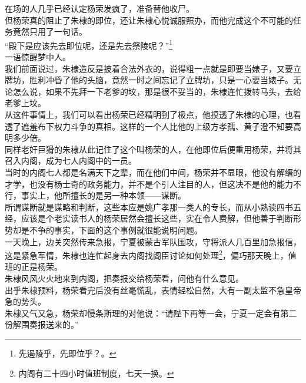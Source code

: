 \begin{multicols}{\theparacolNo}
在场的人几乎已经认定杨荣发疯了，准备替他收尸。\\

但杨荣真的阻止了朱棣的即位，还让朱棣心悦诚服照办，而他完成这个不可能的任务竟然只用了一句话。\\

“殿下是应该先去即位呢，还是先去祭陵呢？”\footnote{先遏陵乎，先即位乎？。}\\

一语惊醒梦中人。\\

我们前面说过，朱棣造反是披着合法外衣的，说得粗一点就是即要当婊子，又要立牌坊，胜利冲昏了他的头脑，竟然一时之间忘记了立牌坊，只是一心要当婊子。无论怎么说，如果不先拜一下老爹的坟，那是很不妥当的，朱棣连忙拨转马头，去给老爹上坟。\\

从这件事情上，我们可以看出杨荣已经精明到了极点，他摸透了朱棣的心理，也看透了遮羞布下权力斗争的真相。这样的一个人比他的上级方孝孺、黄子澄不知要高明多少倍。\\

同样老奸巨猾的朱棣从此记住了这个叫杨荣的人，在他即位后便重用杨荣，并将其召入内阁，成为七人内阁中的一员。\\

当时的内阁七人都是名满天下之辈，而在他们中间，杨荣并不显眼，他没有解缙的才学，也没有杨士奇的政务能力，并不是个引人注目的人，但这决不是他的能力不行，事实上，他所擅长的是另一种本领——谋断。\\

所谓谋断就是谋略和判断，这些本应是姚广孝那一类人的专长，而从小熟读四书五经，应该是个老实读书人的杨荣居然会擅长这些，实在令人费解，但他善于判断形势却是不争的事实，下面的这个事例就很能说明问题。\\

一天晚上，边关突然传来急报，宁夏被蒙古军队围攻，守将派人几百里加急报信，这是紧急军情，朱棣也连忙起身去内阁找阁臣讨论如何处理\footnote{内阁有二十四小时值班制度，七天一换。}，偏巧那天晚上，值班的正是杨荣。\\

朱棣风风火火地来到内阁，把奏报交给杨荣看，问他有什么意见。\\

出乎朱棣预料，杨荣看完后没有丝毫慌乱，表情轻松自然，大有一副太监不急皇帝急的势头。\\

朱棣又气又急，杨荣却慢条斯理的对他说：“请陛下再等一会，宁夏一定会有第二份解围奏报送来的。”\\


\end{multicols}
